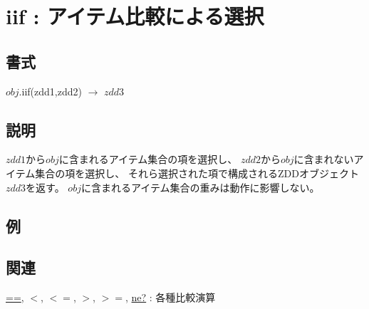 
\section{iif : アイテム比較による選択\label{sect:iif}}
\subsection*{書式}
$obj$.iif(zdd1,zdd2) $\rightarrow$ $zdd3$

\subsection*{説明}
$zdd1$から$obj$に含まれるアイテム集合の項を選択し、
$zdd2$から$obj$に含まれないアイテム集合の項を選択し、
それら選択された項で構成されるZDDオブジェクト$zdd3$を返す。
$obj$に含まれるアイテム集合の重みは動作に影響しない。

\subsection*{例}


\subsection*{関連}
\hyperref[sect:eq]{==},
\hyperref[sect:lt]{$<$},
\hyperref[sect:le]{$<=$},
\hyperref[sect:gt]{$>$},
\hyperref[sect:ge]{$>=$},
\hyperref[sect:ne]{ne?} : 各種比較演算

